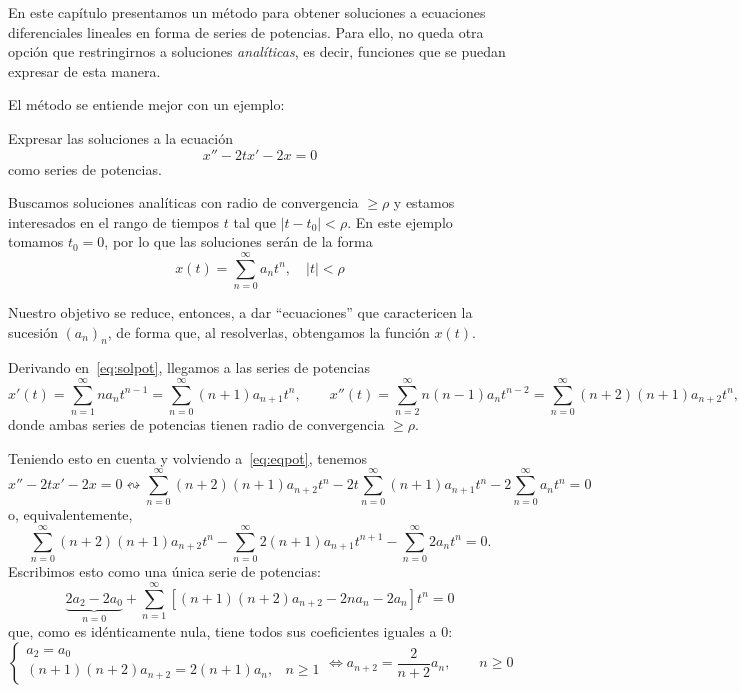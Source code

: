 \documentclass[../main.tex]{subfiles}
\begin{document}
En este capítulo presentamos un método para obtener soluciones a ecuaciones
diferenciales lineales en forma de series de potencias. Para ello, no queda otra
opción que restringirnos a soluciones \emph{analíticas}, es decir, funciones que
se puedan expresar de esta manera.

El método se entiende mejor con un ejemplo:

\begin{example}
  Expresar las soluciones a la ecuación
  \begin{equation} \label{eq:eqpot}
    x''-2tx'-2x=0
  \end{equation}
  como series de potencias.

  Buscamos soluciones analíticas con radio de convergencia \(\geq \rho\) y
  estamos interesados en el rango de tiempos \(t\) tal que \(|t-t_0| <
  \rho\). En este ejemplo tomamos \(t_0 = 0\), por lo que las soluciones serán
  de la forma
  \begin{equation}
    \label{eq:solpot}
    x(t) = \sum_{n=0}^\infty a_nt^n, \quad |t| < \rho
  \end{equation}

  Nuestro objetivo se reduce, entonces, a dar ``ecuaciones'' que caractericen la
  sucesión \((a_n)_n\), de forma que, al resolverlas, obtengamos la función \(x(t)\).

  Derivando en~\eqref{eq:solpot}, llegamos a las series de potencias
  \[x'(t) = \sum_{n=1}^\infty na_nt^{n-1} = \sum_{n=0}^\infty (n+1)a_{n+1}t^n,
    \qquad
  x''(t) = \sum_{n=2}^\infty n(n-1)a_nt^{n-2} = \sum_{n=0}^\infty
  (n+2)(n+1)a_{n+2}t^n,\]
donde ambas series de potencias tienen radio de convergencia \(\geq \rho\).

Teniendo esto en cuenta y volviendo a~\eqref{eq:eqpot}, tenemos
\[x''-2tx'-2x=0 \leftrightsquigarrow \sum_{n=0}^\infty (n+2)(n+1)a_{n+2}t^n -
  2t \sum_{n=0}^\infty (n+1)a_{n+1}t^n - 2 \sum_{n=0}^\infty a_nt^n = 0\]
o, equivalentemente,
\[\sum_{n=0}^\infty (n+2)(n+1)a_{n+2}t^n - \sum_{n=0}^\infty
  2(n+1)a_{n+1}t^{n+1} - \sum_{n=0}^\infty 2a_nt^n = 0.\]
Escribimos esto como una única serie de potencias:
\[\underbrace{2a_2-2a_0}_{n=0} +
  \sum_{n=1}^\infty[(n+1)(n+2)a_{n+2}-2na_n-2a_n]t^n = 0\]
que, como es idénticamente nula, tiene todos sus coeficientes iguales a 0:
\begin{equation}
  \label{eq:seqpot}
  \begin{cases}
    a_2 = a_0 \\
    (n+1)(n+2)a_{n+2} = 2(n+1)a_n, & n \geq 1
  \end{cases} \iff
  a_{n+2} = \frac{2}{n+2} a_n, \qquad n \geq 0
\end{equation}


\end{example}
\end{document}
